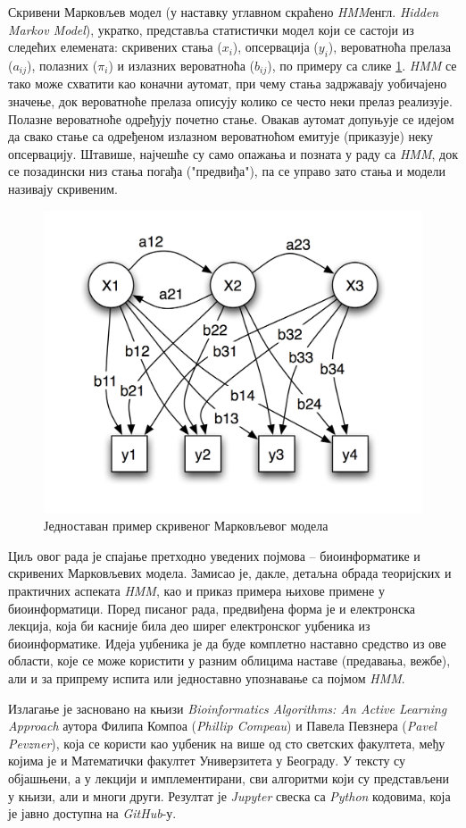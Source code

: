 \documentclass[12pt,oneside]{memoir}
\begin{document}
\begin{CJK}{UTF8}{ipxm}
Скривени Марковљев модел (у наставку углавном скраћено \textit{HMM}енгл. \textit{Hidden Markov Model}), укратко, представља статистички модел који се састоји из следећих елемената: скривених стања ($x_i$), опсервација ($y_i$), вероватноћа прелаза ($a_{ij}$), полазних ($\pi_i$) и излазних вероватноћа ($b_{ij}$), по примеру са слике \ref{fig:hmm}. \textit{HMM} се тако може схватити као коначни аутомат, при чему стања задржавају уобичајено значење, док вероватноће прелаза описују колико се често неки прелаз реализује. Полазне вероватноће одређују почетно стање. Овакав аутомат допуњује се идејом да свако стање са одређеном излазном вероватноћом емитује (приказује) неку опсервацију. Штавише, најчешће су само опажања и позната у раду са \textit{HMM}, док се позадински низ стања погађа ("предвиђа"), па се управо зато стања и модели називају скривеним\cite{stamp2021}.

\begin{figure}[H]
  \centering
  \includegraphics[width=.74\textwidth]{hmm.png}
  \caption{Једноставан пример скривеног Марковљевог модела\cite{hmm}}
  \label{fig:hmm}
\end{figure}

Циљ овог рада је спајање претходно уведених појмова -- биоинформатике и скривених Марковљевих модела. Замисао је, дакле, детаљна обрада теоријских и практичних аспеката \textit{HMM}, као и приказ примера њихове примене у биоинформатици. Поред писаног рада, предвиђена форма је и електронска лекција, која би касније била део ширег електронског уџбеника из биоинформатике. Идеја уџбеника је да буде комплетно наставно средство из ове области, које се може користити у разним облицима наставе (предавања, вежбе), али и за припрему испита или једноставно упознавање са појмом \textit{HMM}. 

Излагање је засновано на књизи \textit{Bioinformatics Algorithms: An Active Learning Approach}\cite{compeau2015} аутора Филипа Компоа (\textit{Phillip Compeau}) и Павела Певзнера (\textit{Pavel Pevzner}), која се користи као уџбеник на више од сто светских факултета\cite{ba}, међу којима је и Математички факултет Универзитета у Београду\cite{matf}. У тексту су објашњени, а у лекцији и имплементирани, сви алгоритми који су представљени у књизи, али и многи други. Резултат је \textit{Jupyter} свеска са \textit{Python} кодовима, која је јавно доступна на \textit{GitHub}-у\cite{vasovich2021}.


\end{CJK}
\end{document}
